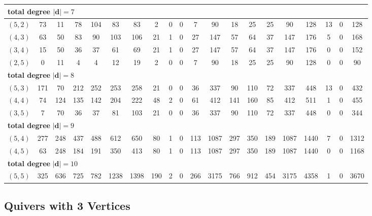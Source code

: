 \documentclass{article}
\newcommand{\bd}{\mathbf{d}}
\begin{document}
\begin{longtable}{|c|c|c|c|c|c|c|c|c|c|c|c|c|c|c|c|c|c|c|c|}
\multicolumn{20}{|l|}{\textbf{total degree }$|\bd|=7$} \\ \hline
$(5,2)$ & 73 & 11 & 78 & 104 & 83 & 83 & 2 & 0 & 0 & 7 & 90 & 18 & 25 & 25 & 90 & 128 & 13 & 0 & 128 \\ \hline
$(4,3)$ & 63 & 50 & 83 & 90 & 103 & 106 & 21 & 1 & 0 & 27 & 147 & 57 & 64 & 37 & 147 & 176 & 5 & 0 & 168 \\ \hline
$(3,4)$ & 15 & 50 & 36 & 37 & 61 & 69 & 21 & 1 & 0 & 27 & 147 & 57 & 64 & 37 & 147 & 176 & 0 & 0 & 152 \\ \hline
$(2,5)$ & 0 & 11 & 4 & 4 & 12 & 19 & 2 & 0 & 0 & 7 & 90 & 18 & 25 & 25 & 90 & 128 & 0 & 0 & 90 \\ \hline
\multicolumn{20}{|l|}{\textbf{total degree }$|\bd|=8$} \\ \hline
$(5,3)$ & 171 & 70 & 212 & 252 & 253 & 258 & 21 & 0 & 0 & 36 & 337 & 90 & 110 & 72 & 337 & 448 & 13 & 0 & 432 \\ \hline
$(4,4)$ & 74 & 124 & 135 & 142 & 204 & 222 & 48 & 2 & 0 & 61 & 412 & 141 & 160 & 85 & 412 & 511 & 1 & 0 & 455 \\ \hline
$(3,5)$ & 7 & 70 & 36 & 37 & 81 & 103 & 21 & 0 & 0 & 36 & 337 & 90 & 110 & 72 & 337 & 448 & 0 & 0 & 344 \\ \hline
\multicolumn{20}{|l|}{\textbf{total degree }$|\bd|=9$} \\ \hline
$(5,4)$ & 277 & 248 & 437 & 488 & 612 & 650 & 80 & 1 & 0 & 113 & 1087 & 297 & 350 & 189 & 1087 & 1440 & 7 & 0 & 1312 \\ \hline
$(4,5)$ & 63 & 248 & 184 & 191 & 350 & 413 & 80 & 1 & 0 & 113 & 1087 & 297 & 350 & 189 & 1087 & 1440 & 0 & 0 & 1168 \\ \hline
\multicolumn{20}{|l|}{\textbf{total degree }$|\bd|=10$} \\ \hline
$(5,5)$ & 325 & 636 & 725 & 782 & 1238 & 1398 & 190 & 2 & 0 & 266 & 3175 & 766 & 912 & 454 & 3175 & 4358 & 1 & 0 & 3670 \\ \hline
\end{longtable}

\subsection*{Quivers with 3 Vertices}
\end{document}
